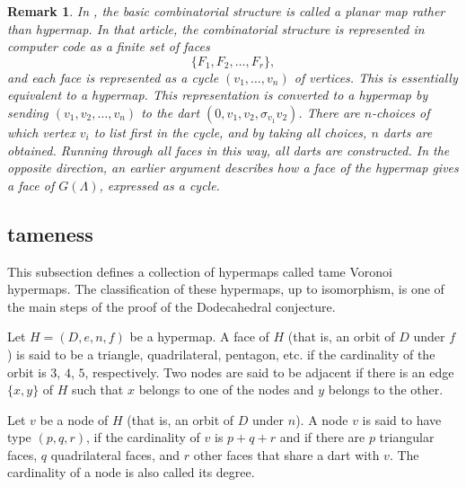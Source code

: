 \documentclass{article} %
\newtheorem{remark}[lemma]{Remark}
\begin{document}
\begin{remark}
In \cite{arx}, the basic combinatorial structure is called a {\it planar map} rather
than hypermap.  In that article, the combinatorial structure is represented in
computer code as a finite set of faces
 $$
  \{F_1,F_2,\ldots,F_r\},
 $$
and each face is represented as a cycle $(v_1,\ldots,v_n)$ of vertices.  This is
essentially equivalent to a hypermap.  This representation
is converted to a hypermap by sending $(v_1,v_2,\ldots,v_n)$ to the dart
$(0,v_1,v_2,\sigma_{v_1} v_2)$.  There are $n$-choices of which vertex $v_i$ to list
first in the cycle, and by taking all choices, $n$ darts are obtained.  Running
through all faces in this way, all darts are constructed.  In the opposite direction,
an earlier argument describes how a face of the hypermap gives a face of $G(\Lambda)$,
expressed as a cycle.
\end{remark}

\subsection{tameness}

This subsection defines a collection of hypermaps called tame Voronoi hypermaps.
The classification of these hypermaps, up to isomorphism, is one of the main steps
of the proof of the Dodecahedral conjecture.

Let $H=(D,e,n,f)$ be a hypermap.  A face of $H$ (that is, an orbit
of $D$ under $f$) is said to be a triangle, quadrilateral, pentagon, etc. if the cardinality
of the orbit is $3$, $4$, $5$, respectively.  Two nodes are said
to be adjacent
if there is an edge $\{x,y\}$ of $H$ such that $x$ belongs to one of the nodes and
$y$ belongs to the other.

  Let $v$ be a node of $H$ (that is, an orbit
of $D$ under $n$).  
A node $v$ is said to have type $(p,q,r)$, if the cardinality of $v$ is $p+q+r$ and if
there are $p$ triangular faces, $q$ quadrilateral faces, and $r$ other faces
that share a dart with $v$.  The cardinality of a node is also
called its degree.
\end{document}
